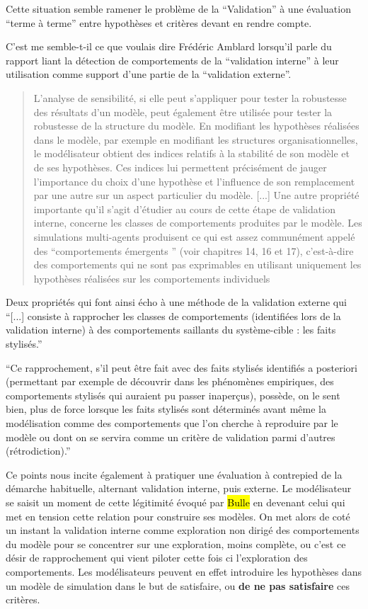 Cette situation semble ramener le problème de la \enquote{Validation} à une évaluation \enquote{terme à terme} entre hypothèses et critères devant en rendre compte. 

C’est me semble-t-il ce que voulais dire Frédéric Amblard \textcite{Amblard2006} lorsqu’il parle du rapport liant la détection de comportements de la \enquote{validation interne} à leur utilisation comme support d’une partie de la \enquote{validation externe}.  

\blockquote[\cite{Amblard2006}]{L'analyse de sensibilité, si elle peut s'appliquer pour tester la robustesse des résultats d'un modèle, peut également être utilisée pour tester la robustesse de la structure du modèle. En modifiant les hypothèses réalisées dans le modèle, par exemple en modifiant les structures organisationnelles, le modélisateur obtient des indices relatifs à la stabilité de son modèle et de ses hypothèses. Ces indices lui permettent précisément de jauger l'importance du choix d’une hypothèse et l’influence de son remplacement par une autre sur un aspect particulier du modèle. [...] Une autre propriété importante qu'il s'agit d'étudier au cours de cette étape de validation interne, concerne les classes de comportements produites par le modèle. Les simulations multi-agents produisent ce qui est assez communément appelé des \enquote{comportements émergents }  (voir chapitres 14, 16 et 17), c'est-à-dire des comportements qui ne sont pas exprimables en utilisant uniquement les hypothèses réalisées sur les comportements individuels}.

Deux propriétés qui font ainsi écho à une méthode de la validation externe qui \enquote{[...] consiste à rapprocher les classes de comportements (identifiées lors de la validation interne) à des comportements saillants du système-cible : les faits stylisés.}


\enquote{Ce rapprochement, s’il peut être fait avec des faits stylisés identifiés a posteriori (permettant par exemple de découvrir dans les phénomènes empiriques, des comportements stylisés qui auraient pu passer inaperçus), possède, on le sent bien, plus de force lorsque les faits stylisés sont déterminés avant même la modélisation comme des comportements que l'on cherche à reproduire par le modèle ou dont on se servira comme un critère de validation parmi d'autres (rétrodiction).}\autocite{Amblard2006}

Ce points nous incite également à pratiquer une évaluation à contrepied de la démarche habituelle, alternant validation interne, puis externe. Le modélisateur se saisit un moment de cette légitimité évoqué par \hl{Bulle} en devenant celui qui met en tension cette relation pour construire ses modèles. On met alors de coté un instant la validation interne comme exploration non dirigé des comportements du modèle pour se concentrer sur une exploration, moins complète, ou c'est ce désir de rapprochement qui vient piloter cette fois ci l'exploration des comportements. Les modélisateurs peuvent en effet introduire les hypothèses dans un modèle de simulation dans le but de satisfaire, ou \textbf{de ne pas satisfaire} ces critères. 

